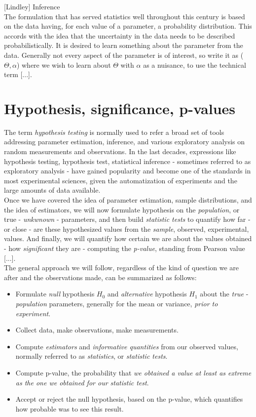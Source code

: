\documentclass{book}
\begin{document}
[Lindley] Inference \\

The formulation that has served statistics well throughout this century is based on the data having, for each value of a parameter, a probability distribution. This accords with the idea that the uncertainty in the data needs to be described probabilistically. It is desired to learn something about the parameter from the data. Generally not every aspect of the parameter is of interest, so write it as ($\Theta, \alpha$) where we wish to learn about $\Theta$ with $\alpha$ as a nuisance, to use the technical term [...].


\section{Hypothesis, significance, p-values}

The term \textit{hypothesis testing} is normally used to refer a broad set of tools addressing parameter estimation, inference, and various exploratory analysis on random measurements and observations. In the last decades, expressions like hypothesis testing, hypothesis test, statistical inference - sometimes referred to as exploratory analysis - have gained popularity and become one of the standards in most experimental sciences, given the automatization of experiments and the large amounts of data available.\\

Once we have covered the idea of parameter estimation, sample distributions, and the idea of estimators, we will now formulate hypothesis on the \textit{population}, or true - \textit{unkwnown} - parameters, and then build \textit{statistic tests} to quantify how far - or close - are these hypothesized values from the \textit{sample}, observed, experimental, values. And finally, we will quantify how certain we are about the values obtained - how \textit{significant} they are - computing the \textit{p-value}, standing from Pearson value [...].\\ The general approach we will follow, regardless of the kind of question we are after and the observations made, can be summarized as follows:

\begin{itemize}
\item Formulate \textit{null} hypothesis $H_0$ and \textit{alternative} hypothesis $H_1$ about the \textit{true} - \textit{population} parameters, generally for the mean or variance, \textit{prior to experiment}.
\item Collect data, make observations, make measurements.
\item Compute \textit{estimators} and \textit{informative quantities} from our observed values, normally referred to as \textit{statistics}, or \textit{statistic tests}.
\item Compute p-value, the probability that \textit{we obtained a value at least as extreme as the one we obtained for our statistic test}.
\item Accept or reject the null hypothesis, based on the p-value, which quantifies how probable was to see this result.
\end{itemize}
\end{document}
